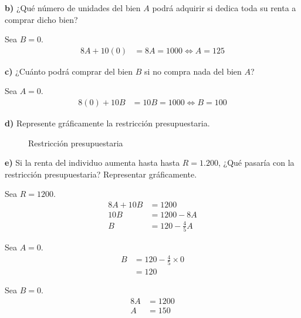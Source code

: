 \documentclass{templateNote}
\begin{document}
\textbf{b)} ¿Qué número de unidades del bien $A$ podrá adquirir si dedica toda su renta a
comprar dicho bien?

Sea $B = 0$.
\begin{align*}
    8A + 10(0) &= 8A = 1000 \Leftrightarrow A = 125
\end{align*}

\textbf{c)} ¿Cuánto podrá comprar del bien $B$ si no compra nada del bien $A$?

Sea $A = 0$.
\begin{align*}
    8(0) + 10B &= 10B = 1000 \Leftrightarrow B = 100
\end{align*}

\textbf{d)} Represente gráficamente la restricción presupuestaria.

\begin{figure}[H]
    \centering
    \caption{Restricción presupuestaria}
\end{figure}

\newpage
\textbf{e)} Si la renta del individuo aumenta hasta hasta $R = 1.200$, ¿Qué pasaría con la
restricción presupuestaria? Representar gráficamente.

Sea $R = 1200$.
\begin{align*}
    8A + 10B &= 1200 \\
    10B &= 1200 - 8A \\
    B &= 120 - \frac{4}{5}A
\end{align*}

Sea $A = 0$.
\begin{align*}
    B &= 120 - \frac{4}{5} \times 0 \\
    &= 120
\end{align*}

Sea $B = 0$.
\begin{align*}
    8A &= 1200 \\
    A &= 150
\end{align*}
\end{document}
